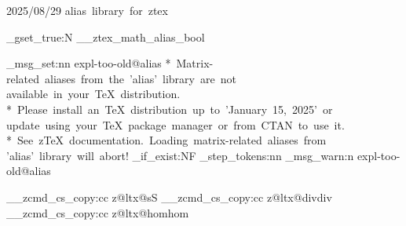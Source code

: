   {2025/08/29}{\ztex@versi@n}
  {alias~library~for~ztex}


\bool_gset_true:N \g__ztex_math_alias_bool
\RequirePackage{amssymb, mathrsfs}
\RequirePackage{mathtools}


\ztex_msg_set:nn { expl-too-old@alias }
  {
    *~Matrix-related~aliases~from~the~'alias'~library~are~not~
    available~in~your~TeX~distribution. \\
    *~Please~install~an~TeX~distribution~up~to~'January~15,~2025'~or~
    update~using~your~TeX~package~manager~or~from~CTAN~to~use~it. \\
    *~See~zTeX~documentation.~Loading~matrix-related~aliases~from~
    'alias'~library~will~abort!
  }
\cs_if_exist:NF \int_step_tokens:nn
  {
    \ztex_msg_warn:n { expl-too-old@alias }
  }


\__zcmd_cs_copy:cc {z@ltx@s}{S}
\__zcmd_cs_copy:cc {z@ltx@div}{div}
\__zcmd_cs_copy:cc {z@ltx@hom}{hom}


